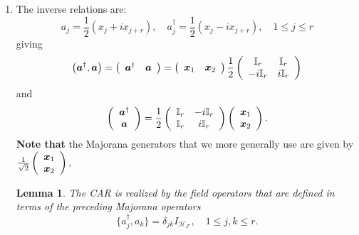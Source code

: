 \documentclass[aps,preprint]{revtex4}%
\newtheorem{lemma}[theorem]{Lemma}
\begin{document}
\begin{enumerate}
\item The inverse relations are:
\[
a_{j}=\frac{1}{2}(x_{j}+ix_{j+r}),\quad a_{j}^{\dagger}=\frac{1}{2}%
(x_{j}-ix_{j+r}),\quad1\leq j\leq r
\]
giving
\begin{equation}
\left(  \boldsymbol{a}^{\dagger},\boldsymbol{a}\right)  =\left(
\begin{array}
[c]{cc}%
\boldsymbol{a}^{\dagger} & \boldsymbol{a}%
\end{array}
\right)  =\left(
\begin{array}
[c]{cc}%
\boldsymbol{x}_{1} & \boldsymbol{x}_{2}%
\end{array}
\right)  \frac{1}{2}\left(
\begin{array}
[c]{cc}%
\mathbb{I}_{r} & \mathbb{I}_{r}\\
-i\mathbb{I}_{r} & i\mathbb{I}_{r}%
\end{array}
\right)
\end{equation}
and
\begin{equation}
\left(
\begin{array}
[c]{c}%
\boldsymbol{a}^{\dagger}\\
\boldsymbol{a}%
\end{array}
\right)  =\frac{1}{2}\left(
\begin{array}
[c]{cc}%
\mathbb{I}_{r} & -i\mathbb{I}_{r}\\
\mathbb{I}_{r} & i\mathbb{I}_{r}%
\end{array}
\right)  \left(
\begin{array}
[c]{c}%
\boldsymbol{x}_{1}\\
\boldsymbol{x}_{2}%
\end{array}
\right)  .
\end{equation}
\textbf{Note that }the Majorana generators that we more generally use are
given by $\frac{1}{\sqrt{2}}\left(
\begin{array}
[c]{c}%
\boldsymbol{x}_{1}\\
\boldsymbol{x}_{2}%
\end{array}
\right)  ,$ 

\begin{lemma}
The CAR is realized by the field operators that are defined in terms of the
preceding Majorana operators
\begin{equation}
\{a_{j}^{\dagger},a_{k}\}=\delta_{jk}I_{\mathcal{H}_{\mathcal{F}}},\quad1\leq
j,k\leq r.
\end{equation}



\end{lemma}
\end{enumerate}
\end{document}
